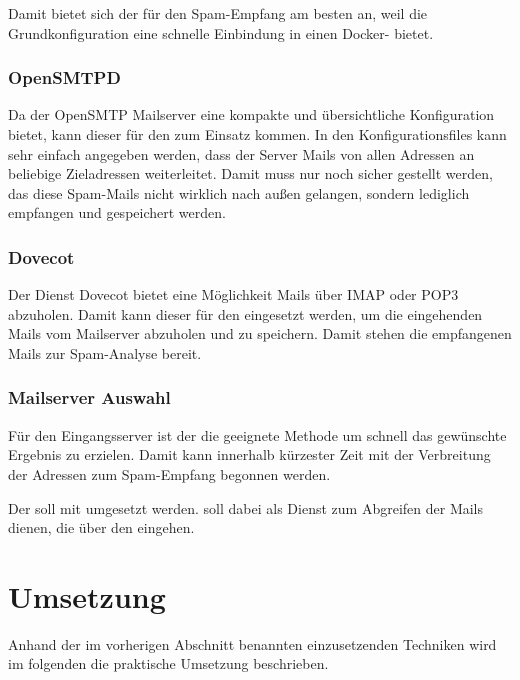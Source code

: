 \documentclass[a4paper,11pt,singlespacing]{article}
\begin{document}
			Damit bietet sich der  für den Spam-Empfang am besten an, weil die Grundkonfiguration eine schnelle Einbindung in einen Docker- bietet.
		
		\subsubsection{OpenSMTPD}\label{sec:AuswahlLösungOpenSMTPD}
			Da der OpenSMTP Mailserver eine kompakte und übersichtliche Konfiguration bietet, kann dieser für den  zum Einsatz kommen. In den Konfigurationsfiles kann sehr einfach angegeben werden, dass der Server Mails von allen Adressen an beliebige Zieladressen weiterleitet.
			Damit muss nur noch sicher gestellt werden, das diese Spam-Mails nicht wirklich nach au{\ss}en gelangen, sondern lediglich empfangen und gespeichert werden.
		
		\subsubsection{Dovecot}\label{sec:AuswahlLösungDovecot}
		Der Dienst Dovecot bietet eine Möglichkeit Mails über IMAP oder POP3 abzuholen. Damit kann dieser für den  eingesetzt werden, um die eingehenden Mails vom Mailserver abzuholen und zu speichern. Damit stehen die empfangenen Mails zur Spam-Analyse bereit.

		\subsubsection{Mailserver Auswahl}\label{sec:MailserverAuswahl}	
		Für den Eingangsserver ist der  die geeignete Methode um schnell das gewünschte Ergebnis zu erzielen. Damit kann innerhalb kürzester Zeit mit der Verbreitung der Adressen zum Spam-Empfang begonnen werden.
		
		Der  soll mit  umgesetzt werden.  soll dabei als Dienst zum Abgreifen der Mails dienen, die über den  eingehen.

\newpage


\section{Umsetzung}\label{sec:Umsetzung}
	Anhand der im vorherigen Abschnitt benannten einzusetzenden Techniken wird im folgenden die praktische Umsetzung beschrieben.
	
\end{document}
